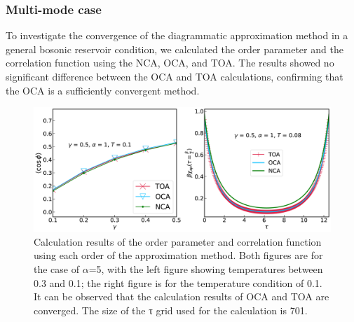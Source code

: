 \documentclass{article}[12pt]
\begin{document}
\begin{spacing}{1.5}
\subsubsection*{Multi-mode case}
To investigate the convergence of the diagrammatic approximation method in a general bosonic reservoir condition, 
we calculated the order parameter and the correlation function using the NCA, OCA, and TOA. 
The results showed no significant difference between the OCA and TOA calculations, confirming that the OCA is a sufficiently convergent method.
\begin{figure}[H]
  \centerline{\includegraphics[width=15cm]{TexFigure/4_1_02_Multi.png}}
  \caption{ Calculation results of the order parameter and correlation function using each order of the approximation method. 
  Both figures are for the case of $\alpha$=5, with the left figure showing temperatures between 0.3 and 0.1; the right figure is for the temperature condition of 0.1. It can be observed that the calculation results of OCA and TOA are converged. 
  The size of the τ grid used for the calculation is 701.}
 \end{figure}

\end{spacing}
\end{document}

